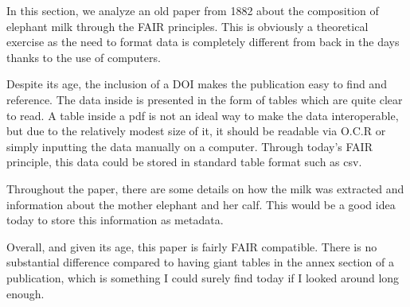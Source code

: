 \documentclass{article}
\begin{document}
In this section, we analyze an old paper from 1882 about the composition of elephant milk \cite{Doremus1881} through the FAIR principles. This is obviously a theoretical exercise as the need to format data is completely different from back in the days thanks to the use of computers. 

Despite its age, the inclusion of a DOI makes the publication easy to find and reference. The data inside is presented in the form of tables which are quite clear to read. A table inside a pdf is not an ideal way to make the data interoperable, but due to the relatively modest size of it, it should be readable via O.C.R or simply inputting the data manually on a computer. Through today's FAIR principle, this data could be stored in standard table format such as csv. 

Throughout the paper, there are some details on how the milk was extracted and information about the mother elephant and her calf. This would be a good idea today to store this information as metadata. 

Overall, and given its age, this paper is fairly FAIR compatible. There is no substantial difference compared to having giant tables in the annex section of a publication, which is something I could surely find today if I looked around long enough.

\printbibliography
\end{document}
